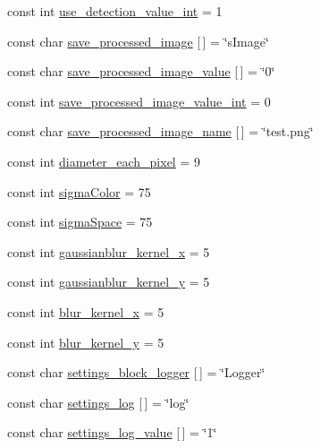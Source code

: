 \begin{DoxyCompactItemize}
const int \mbox{\hyperlink{namespaceyenot_a8ba9c1f83b4502a37417a016875a3918}{use\+\_\+detection\+\_\+value\+\_\+int}} = 1
\item 
const char \mbox{\hyperlink{namespaceyenot_ab35e22cfa0a4ef6c8e960cfa75873aa0}{save\+\_\+processed\+\_\+image}} \mbox{[}$\,$\mbox{]} = \char`\"{}s\+Image\char`\"{}
\item 
const char \mbox{\hyperlink{namespaceyenot_ace3fd31c709279dc1bb3450404d770b0}{save\+\_\+processed\+\_\+image\+\_\+value}} \mbox{[}$\,$\mbox{]} = \char`\"{}0\char`\"{}
\item 
const int \mbox{\hyperlink{namespaceyenot_accc48c2808f0c8c98f853614c546b5eb}{save\+\_\+processed\+\_\+image\+\_\+value\+\_\+int}} = 0
\item 
const char \mbox{\hyperlink{namespaceyenot_afe93bb98a5b2fd1f0cab330e4da59332}{save\+\_\+processed\+\_\+image\+\_\+name}} \mbox{[}$\,$\mbox{]} = \char`\"{}test.\+png\char`\"{}
\item 
const int \mbox{\hyperlink{namespaceyenot_a6c5730ae743bc1203438dfcf6f35faeb}{diameter\+\_\+each\+\_\+pixel}} = 9
\item 
const int \mbox{\hyperlink{namespaceyenot_a54032afcd8390f4a4975bbf20ffa248c}{sigma\+Color}} = 75
\item 
const int \mbox{\hyperlink{namespaceyenot_adbbb6d50f7db1942c60be8b5d621d3b7}{sigma\+Space}} = 75
\item 
const int \mbox{\hyperlink{namespaceyenot_a7b716ae635492024820f16eb8c04a385}{gaussianblur\+\_\+kernel\+\_\+x}} = 5
\item 
const int \mbox{\hyperlink{namespaceyenot_a9f129e682fdc00d2869d4ed69a4c6aa7}{gaussianblur\+\_\+kernel\+\_\+y}} = 5
\item 
const int \mbox{\hyperlink{namespaceyenot_a1b60119efa619ee2a1a927d430e984d2}{blur\+\_\+kernel\+\_\+x}} = 5
\item 
const int \mbox{\hyperlink{namespaceyenot_ad178c04ee8518b1553ee1ab5b5054712}{blur\+\_\+kernel\+\_\+y}} = 5
\item 
const char \mbox{\hyperlink{namespaceyenot_a13c8b24e2bbaab0c3bf3fe14e3f495bb}{settings\+\_\+block\+\_\+logger}} \mbox{[}$\,$\mbox{]} = \char`\"{}Logger\char`\"{}
\item 
const char \mbox{\hyperlink{namespaceyenot_ad8a7ef4466cc151f6f380b4c4ccbfa66}{settings\+\_\+log}} \mbox{[}$\,$\mbox{]} = \char`\"{}log\char`\"{}
\item 
const char \mbox{\hyperlink{namespaceyenot_a8e18cd22c222abdaffa0e12b65af2ac5}{settings\+\_\+log\+\_\+value}} \mbox{[}$\,$\mbox{]} = \char`\"{}1\char`\"{}

\end{DoxyCompactItemize}
